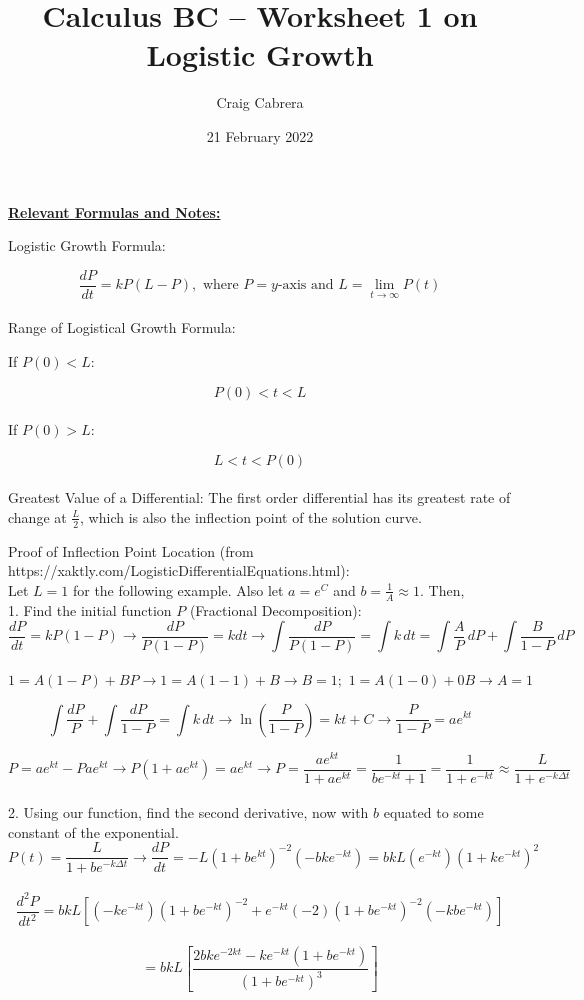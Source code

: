 \documentclass[10pt,letterpaper]{report}
\title{Calculus BC -- Worksheet 1 on Logistic Growth}
\author{Craig Cabrera}
\date{21 February 2022}
\begin{document}
\maketitle
\begin{center}
  \textbf{\underline{Relevant Formulas and Notes:}}
\end{center}

\noindent Logistic Growth Formula: 

$$\frac{dP}{dt}=kP(L-P), \text{ where } P=y\text{-axis} \text{ and } L=\lim_{t\to\infty}P(t)$$ \\

\noindent Range of Logistical Growth Formula:

\noindent If $P(0)<L$:

$$P(0)< t< L$$ \\

\noindent If $P(0)>L$:

$$L< t< P(0)$$ \\

\noindent Greatest Value of a Differential: The first order differential has its greatest rate of change at $\frac{L}{2}$, which is also the inflection point of the solution curve. \\
\pagebreak

\noindent Proof of Inflection Point Location (from https://xaktly.com/LogisticDifferentialEquations.html): \\
\noindent Let $L=1$ for the following example. Also let $a=e^{C}$ and $b=\frac{1}{A}\approx 1$. Then, \\

1. Find the initial function $P$ (Fractional Decomposition):
$$\frac{dP}{dt}=kP(1-P)\rightarrow \frac{dP}{P(1-P)}=kdt\rightarrow \int{\frac{dP}{P(1-P)}}=\int{k}\,dt=\int{\frac{A}{P}}\,dP+\int{\frac{B}{1-P}}\,dP$$ \\ 

$$1=A(1-P)+BP\rightarrow 1=A(1-1)+B\rightarrow B=1; \, \, 1=A(1-0)+0B\rightarrow A=1$$ 

$$\int{\frac{dP}{P}}+\int{\frac{dP}{1-P}}=\int{k}\,dt\rightarrow \ln{\left(\frac{P}{1-P}\right)}=kt+C\rightarrow \frac{P}{1-P}=ae^{kt}$$ 

$$P=ae^{kt}-Pae^{kt}\rightarrow P(1+ae^{kt})=ae^{kt}\rightarrow P=\frac{ae^{kt}}{1+ae^{kt}}=\frac{1}{be^{-kt}+1}=\frac{1}{1+e^{-kt}}\approx\frac{L}{1+e^{-k\Delta t}}$$ \\

2. Using our function, find the second derivative, now with $b$ equated to some constant of the exponential. 
$$P(t)=\frac{L}{1+be^{-k\Delta t}}\rightarrow \frac{dP}{dt}=-L(1+be^{kt})^{-2}(-bke^{-kt})=bkL(e^{-kt})(1+ke^{-kt})^{2}$$ \\
$$\frac{d^{2}P}{dt^{2}}=bkL\left[(-ke^{-kt})(1+be^{-kt})^{-2}+e^{-kt}(-2)(1+be^{-kt})^{-2}(-kbe^{-kt})\right]$$ \\
$$=bkL\left[\frac{2bke^{-2kt}-ke^{-kt}(1+be^{-kt})}{(1+be^{-kt})^{3}}\right]$$ \\
\end{document}
